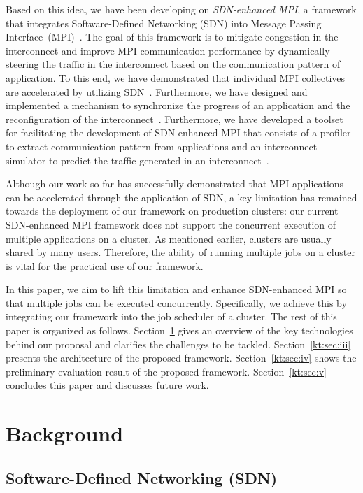 \documentclass[graybox]{svmult}
\begin{document}
Based on this idea, we have been developing on \textit{SDN-enhanced MPI}, a
framework that integrates Software-Defined Networking (SDN) into Message
Passing Interface~(MPI)~\cite{MPIForum2012}. The goal of this framework is to
mitigate congestion in the interconnect and improve MPI communication
performance by dynamically steering the traffic in the interconnect based on
the communication pattern of application. To this end, we have demonstrated
that individual MPI collectives are accelerated by utilizing
SDN~\cite{Dashdavaa2014,Takahashi2014}. Furthermore, we have designed and
implemented a mechanism to synchronize the progress of an application and the
reconfiguration of the interconnect~\cite{Takahashi2015,Takahashi2018}.
Furthermore, we have developed a toolset for facilitating the development of
SDN-enhanced MPI that consists of a profiler to extract communication pattern
from applications and an interconnect simulator to predict the traffic
generated in an interconnect~\cite{Takahashi2017}.

Although our work so far has successfully demonstrated that MPI applications
can be accelerated through the application of SDN, a key limitation has
remained towards the deployment of our framework on production clusters: our
current SDN-enhanced MPI framework does not support the concurrent execution
of multiple applications on a cluster. As mentioned earlier, clusters are
usually shared by many users. Therefore, the ability of running multiple jobs
on a cluster is vital for the practical use of our framework.

In this paper, we aim to lift this limitation and enhance SDN-enhanced MPI so
that multiple jobs can be executed concurrently. Specifically, we achieve this
by integrating our framework into the job scheduler of a cluster. The rest of
this paper is organized as follows. Section~\ref{kt:sec:ii} gives an overview
of the key technologies behind our proposal and clarifies the challenges to be
tackled. Section~\ref{kt:sec:iii} presents the architecture of the proposed
framework. Section~\ref{kt:sec:iv} shows the preliminary evaluation result of
the proposed framework. Section~\ref{kt:sec:v} concludes this paper and
discusses future work.

\section{Background}\label{kt:sec:ii}

\subsection{Software-Defined Networking (SDN)}
\end{document}
